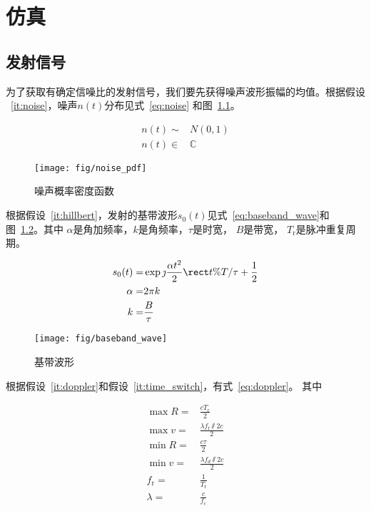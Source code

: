 \documentclass[../main]{subfiles}
\begin{document}
\chapter{仿真}%
\label{cha:simulate}

\section{发射信号}%
\label{sec:emit}

为了获取有确定信噪比的发射信号，我们要先获得噪声波形振幅的均值。根据假设%
~\ref{it:noise}，噪声$n(t)$分布见式~\ref{eq:noise}
和图~\ref{fig:noise_pdf}。

\begin{align}
  \label{eq:noise}
  n(t) \sim & N(0, 1)\\
  n(t) \in & \mathbb{C}
\end{align}

\begin{figure}[htbp]
  \centering
  \texttt{[image: fig/noise\_pdf]}
  \caption{噪声概率密度函数}%
  \label{fig:noise_pdf}
\end{figure}

根据假设~\ref{it:hillbert}，发射的基带波形$s_0(t)$见式~\ref{eq:baseband_wave}和图~\ref{fig:baseband_wave}。其中
$\alpha$是角加频率，$k$是角频率，$\tau$是时宽，
$B$是带宽，
$T_\mathrm{r}$是脉冲重复周期。

\begin{align}
  \label{eq:baseband_wave}
  s_0(t) = & \exp{\jmath\frac{\alpha t^2}{2}} \rect{t\%T / \tau +
  \frac{1}{2}}\\
  \alpha = & 2\pi k\\
  k = & \frac{B}{\tau}
\end{align}

\begin{figure}[htbp]
  \centering
  \texttt{[image: fig/baseband\_wave]}
  \caption{基带波形}%
  \label{fig:baseband_wave}
\end{figure}

根据假设~\ref{it:doppler}和假设~\ref{it:time_switch}，有式~\ref{eq:doppler}。
其中

\begin{align}
  \label{eq:doppler}
  \max{R} = & \frac{cT_\mathrm{r}}{2}\\
  \max{v} = & \frac{\lambda f_\mathrm{r}\varparallel 2c}{2}\\
  \min{R} = & \frac{c\tau}{2}\\
  \min{v} = & \frac{\lambda f_d\varparallel 2c}{2}\\
  f_\mathrm{r} = & \frac{1}{T_\mathrm{r}}\\
  \lambda = & \frac{c}{f_\mathrm{c}}
\end{align}
\end{document}
